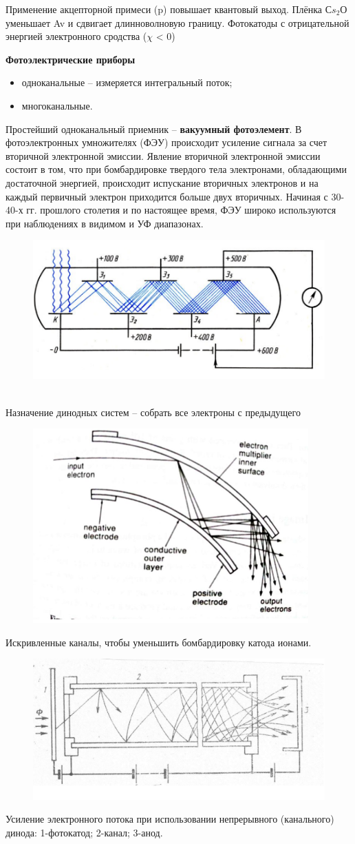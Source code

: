 \documentclass[12pt]{article}
\begin{document}
Применение акцепторной примеси (p)
повышает квантовый выход.
Плёнка $Сs_2О$ уменьшает
Av и сдвигает длинноволновую границу.
Фотокатоды с отрицательной энергией
электронного сродства ($\chi$ < 0)

\textbf{Фотоэлектрические приборы}
\begin{itemize}
	\item  одноканальные – измеряется интегральный поток;
	\item  многоканальные.
\end{itemize}

Простейший одноканальный приемник -- \textbf{вакуумный фотоэлемент}.
В фотоэлектронных умножителях (ФЭУ) происходит усиление сигнала за счет
вторичной электронной эмиссии.
Явление вторичной электронной эмиссии состоит в том, что при бомбардировке
твердого тела
электронами, обладающими достаточной энергией, происходит испускание вторичных
электронов и на каждый первичный электрон приходится больше двух вторичных.
Начиная с 30-40-х гг. прошлого столетия и по настоящее время, ФЭУ широко
используются при наблюдениях в видимом и УФ диапазонах.
\begin{figure}[h]
	\centering
	\includegraphics[width=0.7\linewidth]{"Снимок экрана от 2024-12-23 18-51-48"}
\end{figure}\\
Назначение динодных систем – собрать все электроны с предыдущего
\begin{figure}[h]
	\centering
	\includegraphics[width=0.4\linewidth]{"Снимок экрана от 2024-12-23 18-53-37"}
\end{figure}

Искривленные каналы, чтобы уменьшить
бомбардировку катода ионами.
\begin{figure}[h]
	\centering
	\includegraphics[width=0.4\linewidth]{"Снимок экрана от 2024-12-23 18-53-44"}
\end{figure}\newpage
Усиление электронного потока при использовании непрерывного (канального)
динода: 1-фотокатод; 2-канал; 3-анод.
\end{document}
